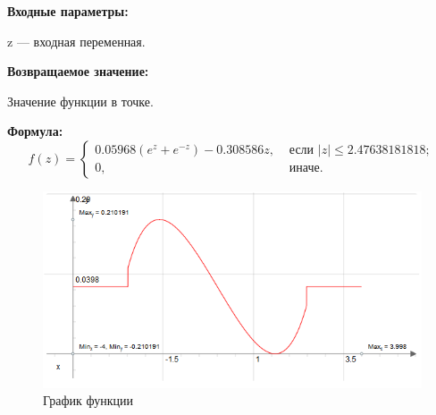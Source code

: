 \textbf{Входные параметры:}
 
z --- входная переменная.

\textbf{Возвращаемое значение:}
 
Значение функции в точке.

\textbf{Формула:}
\begin{equation*}
f\left(z \right)=\left\lbrace \begin{aligned} 0.05968\left( e^z+e^{-z}\right)-0.308586 z,& \text{ если } \left| z\right|\leq 2.47638181818 ; \\ 0,& \text{ иначе}. \end{aligned}\right.
\end{equation*}

 \begin{figure} [h] 
   \center
   \includegraphics {HML_DerivativeOfBellShapedKernelExp_Graph.png}
   \caption{График функции} 
   \label{img:HML_DerivativeOfBellShapedKernelExp_Graph}  
 \end{figure}